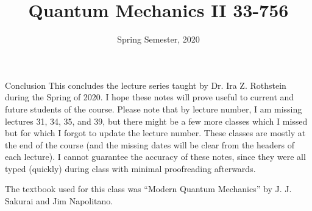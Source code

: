 \documentclass[a4paper, twoside]{report}
\title{Quantum Mechanics II 33-756}
\date{Spring Semester, 2020}
\begin{document}
\maketitle
\tableofcontents




































\begin{note}{Conclusion}
    This concludes the lecture series taught by Dr. Ira Z. Rothstein during the Spring of 2020. I hope these notes will prove useful to current and future students of the course. Please note that by lecture number, I am missing lectures 31, 34, 35, and 39, but there might be a few more classes which I missed but for which I forgot to update the lecture number. These classes are mostly at the end of the course (and the missing dates will be clear from the headers of each lecture). I cannot guarantee the accuracy of these notes, since they were all typed (quickly) during class with minimal proofreading afterwards.

    The textbook used for this class was ``Modern Quantum Mechanics'' by J. J. Sakurai and Jim Napolitano.
\end{note}
\end{document}
